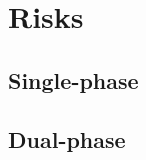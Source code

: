 \chapter{Risks}
\label{ch:tc-risks}

\section{Single-phase}
\label{sec:tc-risks-sp}





\section{Dual-phase}
\label{sec:tc-risks-dp}


